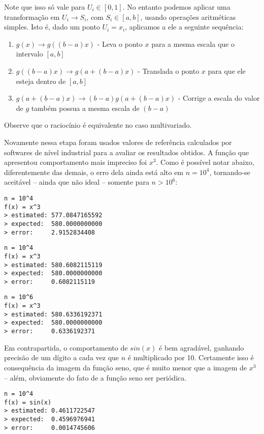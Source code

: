 \documentclass[11pt,reqno,a4paper]{amsart}
\begin{document}
\bigskip
Note que isso só vale para $U_i \in [0,1]$. No entanto podemos aplicar uma transformação em $U_i \to S_i$, com $S_i \in [a,b]$, usando operações aritméticas simples. Isto é, dado um ponto $U_i = x_i$, aplicamos a ele a seguinte sequência:

\medskip
\begin{enumerate}
    \item $g(x) \to g((b-a)x)$ - Leva o ponto $x$ para a mesma escala que o intervalo $[a,b]$
    \item $g((b-a)x) \to g(a+(b-a)x)$ - Translada o ponto $x$ para que ele esteja dentro de  $[a,b]$
    \item $g(a+(b-a)x) \to (b-a)g(a+(b-a)x)$ - Corrige a escala do valor de $g$ também possua a mesma escala de $(b-a)$
\end{enumerate}

\bigskip
Observe que o raciocínio é equivalente no caso multivariado.

\bigskip
Novamente nessa etapa foram usados valores de referência calculados por softwares de nível industrial para a avaliar os resultados obtidos. A função que apresentou comportamento mais impreciso foi $x^3$. Como é possível notar abaixo, diferentemente das demais, o erro dela ainda está alto em $n=10^4$,  tornando-se aceitável – ainda que não ideal – somente para $n > 10^6$:

\begin{verbatim}
n = 10^4
f(x) = x^3
> estimated: 577.0847165592
> expected:  580.0000000000
> error:     2.9152834408
\end{verbatim}

\begin{verbatim}
n = 10^4
f(x) = x^3
> estimated: 580.6082115119
> expected:  580.0000000000
> error:     0.6082115119
\end{verbatim}

\begin{verbatim}
n = 10^6
f(x) = x^3
> estimated: 580.6336192371
> expected:  580.0000000000
> error:     0.6336192371
\end{verbatim}

\bigskip
Em contrapartida, o comportamento de $sin(x)$ é bem agradável, ganhando precisão de um dígito a cada vez que $n$ é multiplicado por 10. Certamente isso é consequência da imagem da função seno, que é muito menor que a imagem de $x^3$ – além, obviamente do fato de a função seno ser periódica.

\begin{verbatim}
n = 10^4
f(x) = sin(x)
> estimated: 0.4611722547
> expected:  0.4596976941
> error:     0.0014745606
\end{verbatim}
\end{document}
